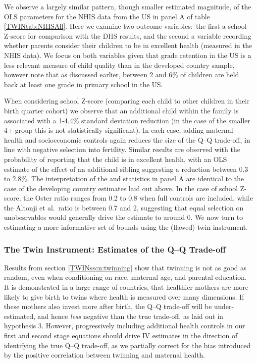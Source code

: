 \documentclass[subeqn]{article}
\begin{document}
\begin{spacing}{1.4}
We observe a largely similar pattern, though smaller estimated magnitude, of
the OLS parameters for the NHIS data from the US in panel A of table
\ref{TWINtab:NHISAll}.  Here we examine two outcome variables:\ the first a
school Z-score for comparison with the DHS results, and the second a variable
recording whether parents consider their children to be in excellent health
(measured in the NHIS data).  We focus on both variables given that grade
retention in the US is a less relevant measure of child quality than in the
developed country sample, however note that as discussed earlier, between 2 and
6\% of children are held back at least one grade in primary school in the US.

When considering school Z-score (comparing each child to other children in their
birth quarter cohort) we observe that an additional child within the family is
associated with a 1-4.4\% standard deviation reduction (in the case of the
smaller 4+ group this is not statistically significant).  In each case, adding
maternal health and socioeconomic controls again reduces the size of the Q--Q
trade-off, in line with negative selection into fertility.  Similar results are
observed with the probability of reporting that the child is in excellent
health, with an OLS estimate of the effect of an additional sibling suggesting
a reduction between 0.3 to 2.8\%.  The interpretation of the
\citeauthor{Altonjietal2005} and \citeauthor{Oster2013} statistics in panel A
are identical to the case of the developing country estimates laid out above.
In the case of school Z-score, the Oster ratio ranges from 0.2 to 0.8 when full
controls are included, while the Altonji et al.\ ratio is between 0.7 and 2,
suggesting that equal selection on unobesrvables would generally drive the
estimate to around 0.  We now turn to estimating a more informative set of
bounds using the (flawed) twin instrument.

\subsubsection{The Twin Instrument: Estimates of the Q--Q Trade-off} \label{TWINsscn:QQtwinsIV}
Results from section \ref{TWINsscn:twinning} show that twinning is not as good
as random, even when conditioning on race, maternal age, and parental education. 
It is demonstrated in a large range of countries, that healthier mothers are 
more likely to give birth to twins where health is measured over many
dimensions. If these mothers also invest more after birth, the Q--Q trade-off
will be under-estimated, and hence \emph{less} negative than the true trade-off,
as laid out in hypothesis 3.  However, progressively including additional
health controls in our first and second stage equations should drive IV
estimates in the direction of identifying the true Q--Q trade-off, as we
partially correct for the bias introduced by the positive correlation between
twinning and maternal health.


\end{spacing}
\end{document}
